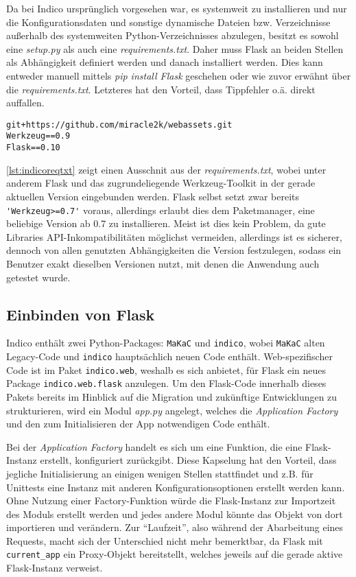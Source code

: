 Da bei Indico ursprünglich vorgesehen war, es systemweit zu installieren und nur die
Konfigurationsdaten und sonstige dynamische Dateien bzw. Verzeichnisse außerhalb des systemweiten
Python-Verzeichnisses abzulegen, besitzt es sowohl eine \emph{setup.py} als auch eine
\emph{requirements.txt}. Daher muss Flask an beiden Stellen als Abhängigkeit definiert werden und
danach installiert werden. Dies kann entweder manuell mittels \emph{pip install Flask} geschehen
oder wie zuvor erwähnt über die \emph{requirements.txt}. Letzteres hat den Vorteil, dass Tippfehler
o.ä. direkt auffallen.

\begin{lstlisting}[caption=Auszug aus der requirements.txt von Indico,label=lst:indicoreqtxt]
git+https://github.com/miracle2k/webassets.git
Werkzeug==0.9
Flask==0.10
\end{lstlisting}

\autoref{lst:indicoreqtxt} zeigt einen Ausschnit aus der \emph{requirements.txt}, wobei unter
anderem Flask und das zugrundeliegende Werkzeug-Toolkit in der gerade aktuellen Version eingebunden
werden. Flask selbst setzt zwar bereits \lstinline{'Werkzeug>=0.7'} voraus, allerdings erlaubt dies
dem Paketmanager, eine beliebige Version ab 0.7 zu installieren. Meist ist dies kein Problem, da
gute Libraries API-Inkompatibilitäten möglichst vermeiden, allerdings ist es sicherer, dennoch von
allen genutzten Abhängigkeiten die Version festzulegen, sodass ein Benutzer exakt dieselben
Versionen nutzt, mit denen die Anwendung auch getestet wurde.


\subsection{Einbinden von Flask}

Indico enthält zwei Python-Packages: \lstinline{MaKaC} und \lstinline{indico}, wobei
\lstinline{MaKaC} alten Legacy-Code und \lstinline{indico} hauptsächlich neuen Code enthält.
Web-spezifischer Code ist im Paket \lstinline{indico.web}, weshalb es sich anbietet, für Flask ein
neues Package \lstinline{indico.web.flask} anzulegen. Um den Flask-Code innerhalb dieses Pakets
bereits im Hinblick auf die Migration und zukünftige Entwicklungen zu strukturieren, wird ein Modul
\emph{app.py} angelegt, welches die \emph{Application Factory} und den zum Initialisieren der App
notwendigen Code enthält.

Bei der \emph{Application Factory} handelt es sich um eine Funktion, die eine Flask-Instanz
erstellt, konfiguriert zurückgibt. Diese Kapselung hat den Vorteil, dass jegliche Initialisierung an
einigen wenigen Stellen stattfindet und z.B. für Unittests eine Instanz mit anderen
Konfigurationsoptionen erstellt werden kann. Ohne Nutzung einer Factory-Funktion würde die
Flask-Instanz zur Importzeit des Moduls erstellt werden und jedes andere Modul könnte das Objekt von
dort importieren und verändern. Zur \enquote{Laufzeit}, also während der Abarbeitung eines Requests,
macht sich der Unterschied nicht mehr bemerktbar, da Flask mit \lstinline{current_app} ein
Proxy-Objekt bereitstellt, welches jeweils auf die gerade aktive Flask-Instanz verweist.

